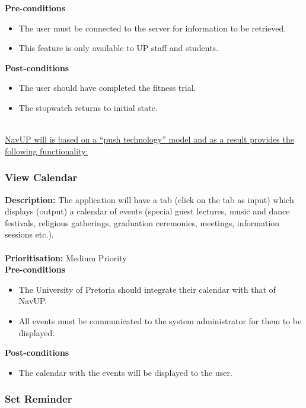\documentclass[runningheads,a4paper]{article}
\begin{document}
  
\textbf{Pre-conditions}
\begin{itemize}
	\item The user must be connected to the server for information to be retrieved.
	\item This feature is only available to UP staff and students.
\end{itemize}
  
\textbf{Post-conditions}
\begin{itemize}
  	\item The user should have completed the fitness trial.
	\item The stopwatch returns to initial state.
\end{itemize}

\noindent \\ \underline{NavUP will is based on a “push technology” model and as a result provides the following functionality:}

\subsubsection{View Calendar}

\textbf{Description:} The application will have a tab (click on the tab as input) which displays (output) a calendar of events (special guest lectures, music and dance festivals, religious gatherings, graduation ceremonies, meetings, information sessions etc.).\\\\
\noindent
\textbf{Prioritisation:} Medium Priority\\
  
  
\textbf{Pre-conditions}
\begin{itemize}
	\item The University of Pretoria should integrate their calendar with that of NavUP.
	\item All events must be communicated to the system administrator for them to be displayed.
\end{itemize}
  
\textbf{Post-conditions}
\begin{itemize}
  	\item The calendar with the events will be displayed to the user.
\end{itemize}

\subsubsection{Set Reminder}
\end{document}
